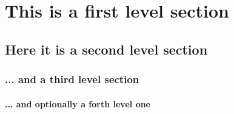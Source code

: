 \documentclass[italian, isTemplate, disablemarginnotes, allowcoloredmath]{../Utils/ClassNotes}
\begin{document}
\section{This is a first level section}
\lipsum[1-3]
\subsection{Here it is a second level section}
\lipsum[4-5]
\subsubsection{... and a third level section}
\lipsum[6]
\paragraph{... and optionally a forth level one}
\lipsum[7]
\end{document}
